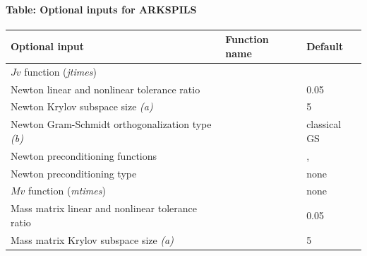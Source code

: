 \documentclass[letterpaper,10pt,english]{sphinxmanual}
\begin{document}
\paragraph{Table: Optional inputs for ARKSPILS}
\label{c_interface/User_callable:cinterface-arkspilsinputtable}\label{c_interface/User_callable:table-optional-inputs-for-arkspils}
\begin{tabulary}{\linewidth}{|L|L|L|}
\hline
\textbf{\relax 
Optional input
} & \textbf{\relax 
Function name
} & \textbf{\relax 
Default
}\\\hline

$Jv$ function (\emph{jtimes})
 & 
{\hyperref[c_interface/User_callable:ARKSpilsSetJacTimesVecFn]{}}
 & 
\\\hline

Newton linear and nonlinear tolerance ratio
 & 
{\hyperref[c_interface/User_callable:ARKSpilsSetEpsLin]{}}
 & 
0.05
\\\hline

Newton Krylov subspace size \emph{(a)}
 & 
{\hyperref[c_interface/User_callable:ARKSpilsSetMaxl]{}}
 & 
5
\\\hline

Newton Gram-Schmidt orthogonalization type \emph{(b)}
 & 
{\hyperref[c_interface/User_callable:ARKSpilsSetGSType]{}}
 & 
classical GS
\\\hline

Newton preconditioning functions
 & 
{\hyperref[c_interface/User_callable:ARKSpilsSetPreconditioner]{}}
 & 
, 
\\\hline

Newton preconditioning type
 & 
{\hyperref[c_interface/User_callable:ARKSpilsSetPrecType]{}}
 & 
none
\\\hline

$Mv$ function (\emph{mtimes})
 & 
{\hyperref[c_interface/User_callable:ARKSpilsSetMassTimesVecFn]{}}
 & 
none
\\\hline

Mass matrix linear and nonlinear tolerance ratio
 & 
{\hyperref[c_interface/User_callable:ARKSpilsSetMassEpsLin]{}}
 & 
0.05
\\\hline

Mass matrix Krylov subspace size \emph{(a)}
 & 
{\hyperref[c_interface/User_callable:ARKSpilsSetMassMaxl]{}}
 & 
5
\\\hline


\end{tabulary}
\end{document}
